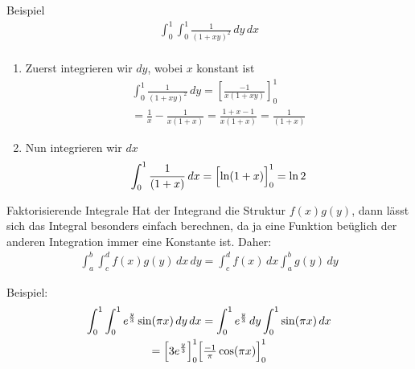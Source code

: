 \begin{frame}{Beispiel}
  \begin{gather*}
    \int_0^1\int_0^1\frac1{(1+xy)^2} \,dy\,dx\\
  \end{gather*}
  \begin{enumerate}
  \item Zuerst integrieren wir $dy$, wobei $x$ konstant ist
    \begin{multline*}
      \int_0^1\frac1{(1+xy)^2} \,dy = \left[
        \frac{-1}{x(1+xy)}
      \right]^1_0
      \\= \frac1x - \frac{1}{x(1+x)}
      = \frac{1+x-1}{x(1+x)} = \frac1{(1+x)}
    \end{multline*}
  \item Nun integrieren wir $dx$
    \begin{gather*}
      \int_0^1  \frac1{(1+x)}\,dx = \Bigl[\ln(1+x)\Bigr]_0^1
      = \ln 2
    \end{gather*}
  \end{enumerate}
\end{frame}

\begin{frame}{Faktorisierende Integrale}
  Hat der Integrand die Struktur \(f(x)g(y)\), dann lässt sich das
  Integral besonders einfach berechnen, da ja eine Funktion beüglich
  der anderen Integration immer eine Konstante ist. Daher:
  \begin{gather*}
    \int_a^b\int_c^d f(x) g(y) \,dx\,dy
    = \int_c^d f(x) \,dx \int_a^b g(y) \,dy
  \end{gather*}

  \pause
  Beispiel:
  \begin{multline*}
    \int_0^1\int_0^1 e^{\frac y3}\sin(\pi x)\,dy\,dx
    = \int_0^1 e^{\frac y3}\,dy \int_0^1 \sin(\pi x)\,dx \\
    = \Bigl[ 3e^{\frac y3}\Bigr]_0^1  \Bigl[\tfrac{-1}\pi \cos(\pi x)\Bigr]_0^1
  \end{multline*}
\end{frame}

